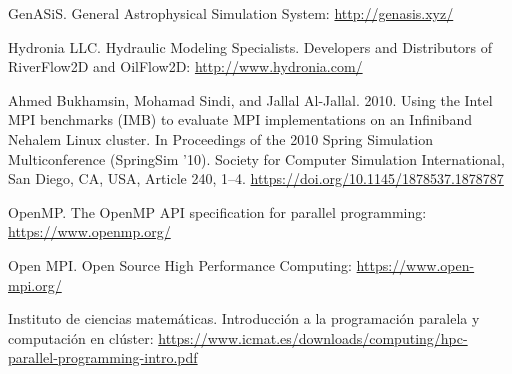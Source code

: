 \documentclass[a4paper,12pt]{article}
\begin{document}
\begin{thebibliography}{}
GenASiS. General Astrophysical Simulation System: \url{http://genasis.xyz/}

Hydronia LLC. Hydraulic Modeling Specialists. Developers and Distributors of RiverFlow2D and OilFlow2D: \url{http://www.hydronia.com/}


Ahmed Bukhamsin, Mohamad Sindi, and Jallal Al-Jallal. 2010. Using the Intel MPI benchmarks (IMB) to evaluate MPI implementations on an Infiniband Nehalem Linux cluster. In Proceedings of the 2010 Spring Simulation Multiconference (SpringSim '10). Society for Computer Simulation International, San Diego, CA, USA, Article 240, 1–4. \url{https://doi.org/10.1145/1878537.1878787}

OpenMP. The OpenMP API specification for parallel programming:
\url{https://www.openmp.org/}

Open MPI. Open Source High Performance Computing: 
\url{https://www.open-mpi.org/}

Instituto de ciencias matemáticas. Introducción a la programación paralela y computación en clúster: 
\url{https://www.icmat.es/downloads/computing/hpc-parallel-programming-intro.pdf}

\end{thebibliography}

\newpage

\appendix
\end{document}
